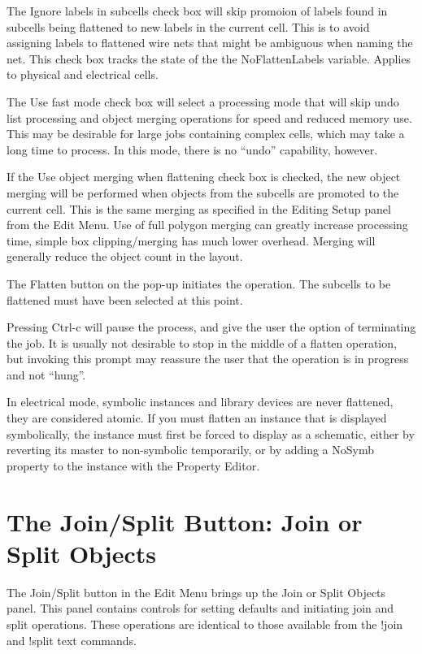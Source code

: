 The {\cb Ignore labels in subcells} check box will skip promoion of
labels found in subcells being flattened to new labels in the current
cell.  This is to avoid assigning labels to flattened wire nets that
might be ambiguous when naming the net.  This check box tracks the
state of the the {\et NoFlattenLabels} variable.  Applies to physical
and electrical cells.

The {\cb Use fast mode} check box will select a processing mode that
will skip undo list processing and object merging operations for speed
and reduced memory use.  This may be desirable for large jobs
containing complex cells, which may take a long time to process.  In
this mode, there is no ``undo'' capability, however.

If the {\cb Use object merging when flattening} check box is checked,
the new object merging will be performed when objects from the
subcells are promoted to the current cell.  This is the same merging
as specified in the {\cb Editing Setup} panel from the {\cb Edit
Menu}.  Use of full polygon merging can greatly increase processing
time, simple box clipping/merging has much lower overhead.  Merging
will generally reduce the object count in the layout.

The {\cb Flatten} button on the pop-up initiates the operation.  The
subcells to be flattened must have been selected at this point.

Pressing {\kb Ctrl-c} will pause the process, and give the user the
option of terminating the job.  It is usually not desirable to stop in
the middle of a flatten operation, but invoking this prompt may
reassure the user that the operation is in progress and not ``hung''.

In electrical mode, symbolic instances and library devices are never
flattened, they are considered atomic.  If you must flatten an
instance that is displayed symbolically, the instance must first be
forced to display as a schematic, either by reverting its master to
non-symbolic temporarily, or by adding a {\et NoSymb} property to the
instance with the {\cb Property Editor}.


\section{The {\cb Join/Split} Button: Join or Split Objects}

The {\cb Join/Split} button in the {\cb Edit Menu} brings up the {\cb
Join or Split Objects} panel.  This panel contains controls for
setting defaults and initiating join and split operations.  These
operations are identical to those available from the {\cb !join} and
{\cb !split} text commands.


